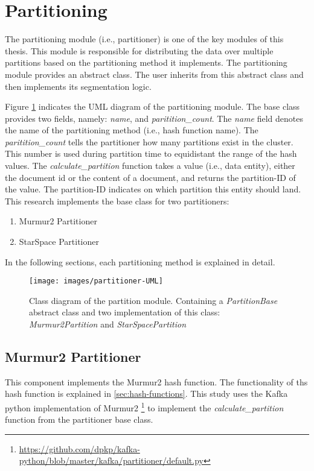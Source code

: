 \section{Partitioning}
\label{sec:partitioning}
The partitioning module (i.e., partitioner) is one of the key modules of this thesis. This module is responsible for distributing the data over multiple partitions based on the partitioning method it implements. The partitioning module provides an abstract class. The user inherits from this abstract class and then implements its segmentation logic. 


Figure \ref{fig:partitioner-uml} indicates the UML diagram of the partitioning module. The base class provides two fields, namely: \emph{name}, and \emph{paritition\_count}. The \emph{name} field denotes the name of the partitioning method (i.e., hash function name). The \emph{paritition\_count} tells the partitioner how many partitions exist in the cluster. This number is used during partition time to equidistant the range of the hash values. The \emph{calculate\_partition} function takes a value (i.e., data entity), either the document id or the content of a document, and returns the partition-ID of the value. The partition-ID indicates on which partition this entity should land. This research implements the base class for two partitioners:

\begin{enumerate}
    \item Murmur2 Partitioner
    \item StarSpace Partitioner
\end{enumerate}

\noindent In the following sections, each partitioning method is explained in detail.

\begin{figure}[!htb]
    \centering
    \texttt{[image: images/partitioner-UML]}
    \caption{Class diagram of the partition module. Containing a \emph{PartitionBase} abstract class and two implementation of this class: \emph{Murmur2Partition} and \emph{StarSpacePartition}}
    \label{fig:partitioner-uml}
\end{figure}


\subsection{Murmur2 Partitioner}
\label{subsec:partitioning-murmur2}
This component implements the Murmur2 hash function. The functionality of ths hash function is explained in \ref{sec:hash-functions}. This study uses the Kafka python implementation of Murmur2 \footnote{\url{https://github.com/dpkp/kafka-python/blob/master/kafka/partitioner/default.py}} to implement the \emph{calculate\_partition} function from the partitioner base class.

